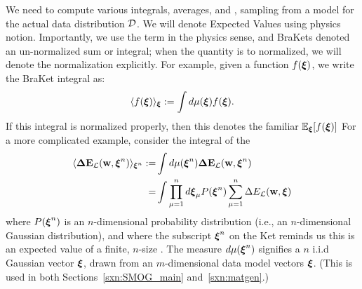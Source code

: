 We need to compute various integrals,  averages, and \emph{\ExpectedValues}, 
 sampling from a model for the actual data distribution $\mathcal{D}$.   
We will denote Expected Values using physics \BraKet notion.  
 Importantly, we use the term \ExpectedValue in the physics sense, and BraKets denoted an un-normalized sum or integral; when the quantity is  to normalized, we will denote the normalization explicitly.
For example, given a function $f(\boldsymbol{\xi})$, 
we write the BraKet integral as:
\begin{align}
 \label{eqn:EuT}
 \langle f(\boldsymbol{\xi}) \rangle_{\boldsymbol{\xi}}:=\int d\mu(\boldsymbol{\xi}) f(\boldsymbol{\xi})  .
\end{align}
If  this integral is normalized properly, then this denotes the familiar \ExpectedValue $\mathbb{E}_{\boldsymbol{\xi}}[f(\boldsymbol{\xi})]$
For a more complicated example, consider the integral of the
\emph{\TotalDataSampleError}
\begin{align}
  \label{eqn:total_data_sample_error}
\nonumber
  \langle \mathbf{\Delta {E}}_{\mathcal{L}}(\mathbf{w}, \boldsymbol{\xi}^{n})\rangle_{\boldsymbol{\xi}^{n}}
  :=  &\int d\mu(\boldsymbol{\xi}^{n}) \mathbf{\Delta {E}}_{\mathcal{L}}(\mathbf{w}, \boldsymbol{\xi}^{n}) \\ 
   = & \int \prod_{\mu=1}^{n}d\boldsymbol{\xi}_{\mu}P(\boldsymbol{\xi}^{n}) \sum_{\mu=1}^{n}\Delta E_{\mathcal{L}}(\mathbf{w},\boldsymbol{\xi})
\end{align}
where $P(\boldsymbol{\xi}^{n})$ is an $n$-dimensional
probability distribution (i.e., an $n$-dimensional Gaussian distribution),
and where the subscript $\boldsymbol{\xi}^{n}$ on the Ket reminds us this is an expected value of a finite, $n$-size \ModelSample.
The measure $d\mu(\boldsymbol{\xi}^{n})$ signifies a $n$ i.i.d Gaussian vector $\boldsymbol{\xi}$, drawn from an $m$-dimensional data model vectors $\boldsymbol{\xi}$.
(This is used in both Sections~\ref{sxn:SMOG_main} and~\ref{sxn:matgen}.)
%

